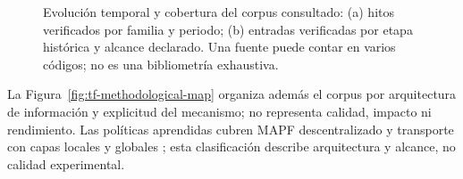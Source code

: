 \begin{figure}[htbp]
{{%
  }}
  \caption{Evoluci\'on temporal y cobertura del corpus consultado: (a) hitos verificados por familia y periodo; (b) entradas verificadas por etapa histórica y alcance declarado. Una fuente puede contar en varios códigos; no es una bibliometr\'ia exhaustiva.}
  \label{fig:tf-literature-timeline}
  \viuownsource
\end{figure}

La Figura~\ref{fig:tf-methodological-map} organiza además el corpus por
arquitectura de información y explicitud del mecanismo; no representa calidad,
impacto ni rendimiento. Las políticas aprendidas cubren MAPF descentralizado
\parencite{sartoretti2019primal,phan2024cactus} y transporte con capas locales y globales \parencite{shibata2023localGlobal,naito2025tihdp}; esta clasificación describe arquitectura y alcance, no calidad experimental.

\nocite{zhang2024coalition,zhou2026cttapf,huang2022mlLns,yu2023graphTransformer,tang2025railgun,paul2023collective,shibata2023event}

